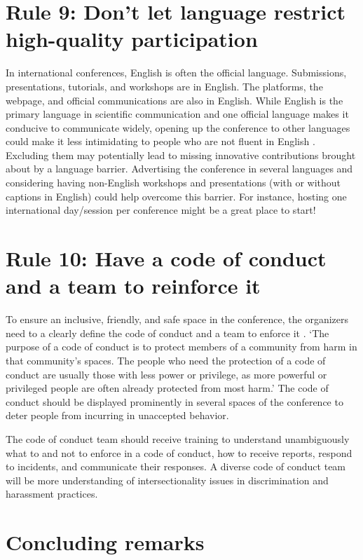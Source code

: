 \documentclass[10pt,letterpaper]{article}
\begin{document}
\section*{Rule 9: Don't let language restrict high-quality participation}

In international conferences, English is often the official language. Submissions, presentations, tutorials, and workshops are in English. The platforms, the webpage, and official communications are also in English. While English is the primary language in scientific communication and one official language makes it conducive to communicate widely, opening up the conference to other languages could make it less intimidating to people who are not fluent in English \cite{niner_better_2021}. Excluding them may potentially lead to missing innovative contributions brought about by a language barrier. Advertising the conference in several languages and considering having non-English workshops and presentations (with or without captions in English) could help overcome this barrier. For instance, hosting one international day/session per conference might be a great place to start!

\section*{Rule 10: Have a code of conduct and a team to reinforce it}

To ensure an inclusive, friendly, and safe space in the conference, the organizers need to a clearly define the code of conduct and a team to enforce it \cite{favaro_your_2016}. `The purpose of a code of conduct is to protect members of a community from harm in that community's spaces. The people who need the protection of a code of conduct are usually those with less power or privilege, as more powerful or privileged people are often already protected from most harm.' \cite{aurora_how_2018}
The code of conduct should be displayed prominently in several spaces of the conference to deter people from incurring in unaccepted behavior.

The code of conduct team should receive training to understand unambiguously what to and not to enforce in a code of conduct, how to receive reports, respond to incidents, and communicate their responses. A diverse code of conduct team will be more understanding of intersectionality issues in discrimination and harassment practices. 



\section*{Concluding remarks}
\end{document}
